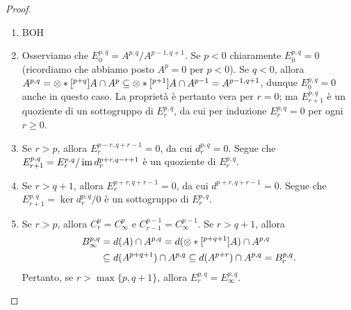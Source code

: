 \begin{proof}
\leavevmode
\begin{enumerate}
\item BOH
\item Osserviamo che $E^{p,q}_0=A^{p,q}/A^{p-1,q+1}$. Se $p<0$ chiaramente $E^{p,q}_0=0$ (ricordiamo che abbiamo posto $A^p=0$ per $p<0$). Se $q<0$, allora $A^{p,q}=\mathbin{\otimes}*[^{p+q}]{A}{}\cap A^p\subseteq\mathbin{\otimes}*[^{p+1}]{A}{}\cap A^{p-1}=A^{p-1,q+1}$, dunque $E^{p,q}_0=0$ anche in questo caso. La proprietà è pertanto vera per $r=0$; ma $E^{p,q}_{r+1}$ è un quoziente di un sottogruppo di $E^{p,q}_r$, da cui per induzione $E^{p,q}_r=0$ per ogni $r\ge 0$.
\item Se $r>p$, allora $E^{p-r,q+r-1}_r=0$, da cui $d^{p,q}_r=0$. Segue che $E^{p,q}_{r+1}=E^{p,q}_r/\operatorname{im} d^{p+r,q-r+1}_r$ è un quoziente di $E^{p,q}_r$.
\item Se $r>q+1$, allora $E^{p+r,q+r-1}_r=0$, da cui $d^{p+r,q+r-1}=0$. Segue che $E^{p,q}_{r+1}=\ker d^{p,q}_r/0$ è un sottogruppo di $E^{p,q}_r$.
\item Se $r>p$, allora $C^p_r=C^p_\infty$ e $C^{p-1}_{r-1}=C^{p-1}_\infty$. Se $r>q+1$, allora
\begin{align*}
B^{p,q}_\infty&=d(A)\cap A^{p,q}=d(\mathbin{\otimes}*[^{p+q+1}]{A}{})\cap A^{p,q}\\
&\subseteq d(A^{p+q+1})\cap A^{p,q}\subseteq d(A^{p+r})\cap A^{p,q}=B^{p,q}_r.
\end{align*}
Pertanto, se $r>\max\{p,q+1\}$, allora $E^{p,q}_r=E^{p,q}_\infty$.
\end{enumerate}
\end{proof}